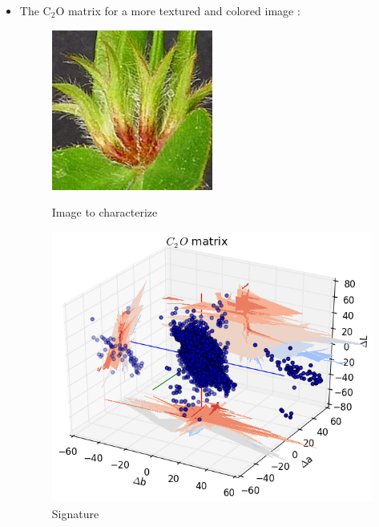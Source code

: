 \documentclass[xcolor=table]{beamer}
\begin{document}
\begin{frame}
\begin{itemize}
{\begin{figure}[htbp]
\begin{minipage}[c]{.55\linewidth}
    \end{minipage}
\end{figure}}
\item<3-> The C$_2$O matrix for a more textured and colored image :
 {\begin{figure}[htbp]
    \begin{minipage}[c]{.40\linewidth}
      \begin{center}
    \includegraphics[scale=0.50]{97p.jpg}
    \caption{Image to characterize}
    \label{fig:Sig}
      \end{center}
    \end{minipage}
    \hfill
    \begin{minipage}[c]{.55\linewidth}
      \begin{center}
    \includegraphics[scale=0.38]{C2OMat97p.png}
    \caption{Signature}
    \label{fig:Sig}
      \end{center}
    \end{minipage}
\end{figure}}

\end{itemize}

\end{frame}
\end{document}
